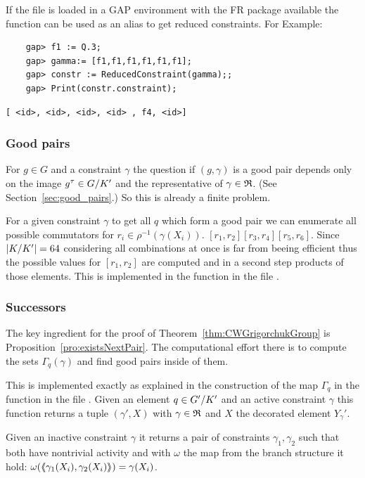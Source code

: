 \documentclass[a4paper,11pt]{amsart}
\begin{document}
If the file  is loaded in a GAP environment with the FR package available 
the function  can be used as an alias to get 
reduced constraints. For Example:
 \begin{lstlisting}
    gap> f1 := Q.3;
    gap> gamma:= [f1,f1,f1,f1,f1,f1];
    gap> constr := ReducedConstraint(gamma);;
    gap> Print(constr.constraint);
\end{lstlisting} 
\begin{verbatim}
[ <id>, <id>, <id>, <id> , f4, <id>]
\end{verbatim} 

\subsubsection{Good pairs}
For $g\in G$ and a constraint $\gamma$ the question if $(g,\gamma)$ is a good
pair depends only on the image $g^\tau\in{G/K'}$ and the representative
of $\gamma\in\mathfrak{R}$. (See Section~\ref{sec:good_pairs}.) So this is already a
finite problem. 

For a given constraint $\gamma$ to get all $q$ which form a good pair we can
enumerate all possible commutators for $r_i\in\rho^{-1}(\gamma(X_i))$.
$[r_1,r_2][r_3,r_4][r_5,r_6]$. Since $\lvert{K/K'}\rvert=64$ considering all 
combinations at once is far from beeing efficient thus the possible values for
$[r_1,r_2]$ are computed and in a second step products of those elements.
This is implemented in the function  in the file
.
\subsubsection{Successors}
The key ingredient for the proof of Theorem~\ref{thm:CWGrigorchukGroup} is
Proposition~\ref{pro:existsNextPair}. The computational effort there is
to compute the sets $\Gamma_q(\gamma)$ and find good pairs inside of them.

This is implemented exactly as explained in the construction of the map
$\Gamma_q$ in the function  in the file 
. Given an element $q\in{G'/K'}$ 
and an active constraint $\gamma$ this function returns a tuple $(\gamma',X)$ 
with $\gamma\in\mathfrak{R}$ and $X$ the decorated element $Y_\gamma'$.

Given an inactive constraint $\gamma$ it returns a pair of constraints
$\gamma_1,\gamma_2$ such that both have nontrivial activity and with
$\omega$ the map from the branch structure it hold:
$\omega(\langle\negthickspace\langle\gamma_1(X_i),\gamma_2(X_i)\rangle\negthickspace\rangle)=\gamma(X_i)$. 
\end{document}
